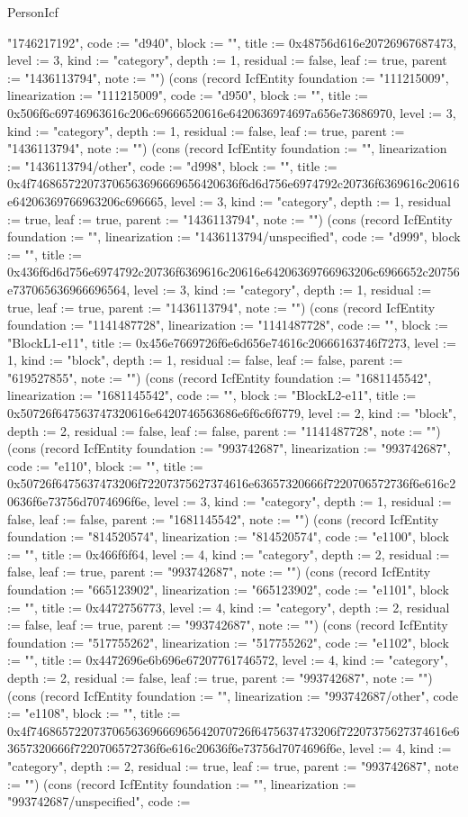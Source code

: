 \begin{lexlean}{PersonIcf}
\begin{semanticmodule}
{"1746217192", code := "d940", block := "", title := 0x48756d616e20726967687473, level := 3, kind := "category", depth := 1, residual := false, leaf := true, parent := "1436113794", note := ""}) (cons (record IcfEntity {foundation := "111215009", linearization := "111215009", code := "d950", block := "", title := 0x506f6c69746963616c206c69666520616e6420636974697a656e73686970, level := 3, kind := "category", depth := 1, residual := false, leaf := true, parent := "1436113794", note := ""}) (cons (record IcfEntity {foundation := "", linearization := "1436113794/other", code := "d998", block := "", title := 0x4f746865722073706563696669656420636f6d6d756e6974792c20736f6369616c20616e64206369766963206c696665, level := 3, kind := "category", depth := 1, residual := true, leaf := true, parent := "1436113794", note := ""}) (cons (record IcfEntity {foundation := "", linearization := "1436113794/unspecified", code := "d999", block := "", title := 0x436f6d6d756e6974792c20736f6369616c20616e64206369766963206c6966652c20756e737065636966696564, level := 3, kind := "category", depth := 1, residual := true, leaf := true, parent := "1436113794", note := ""}) (cons (record IcfEntity {foundation := "1141487728", linearization := "1141487728", code := "", block := "BlockL1-e11", title := 0x456e7669726f6e6d656e74616c20666163746f7273, level := 1, kind := "block", depth := 1, residual := false, leaf := false, parent := "619527855", note := ""}) (cons (record IcfEntity {foundation := "1681145542", linearization := "1681145542", code := "", block := "BlockL2-e11", title := 0x50726f647563747320616e6420746563686e6f6c6f6779, level := 2, kind := "block", depth := 2, residual := false, leaf := false, parent := "1141487728", note := ""}) (cons (record IcfEntity {foundation := "993742687", linearization := "993742687", code := "e110", block := "", title := 0x50726f6475637473206f72207375627374616e63657320666f7220706572736f6e616c20636f6e73756d7074696f6e, level := 3, kind := "category", depth := 1, residual := false, leaf := false, parent := "1681145542", note := ""}) (cons (record IcfEntity {foundation := "814520574", linearization := "814520574", code := "e1100", block := "", title := 0x466f6f64, level := 4, kind := "category", depth := 2, residual := false, leaf := true, parent := "993742687", note := ""}) (cons (record IcfEntity {foundation := "665123902", linearization := "665123902", code := "e1101", block := "", title := 0x4472756773, level := 4, kind := "category", depth := 2, residual := false, leaf := true, parent := "993742687", note := ""}) (cons (record IcfEntity {foundation := "517755262", linearization := "517755262", code := "e1102", block := "", title := 0x4472696e6b696e67207761746572, level := 4, kind := "category", depth := 2, residual := false, leaf := true, parent := "993742687", note := ""}) (cons (record IcfEntity {foundation := "", linearization := "993742687/other", code := "e1108", block := "", title := 0x4f74686572207370656369666965642070726f6475637473206f72207375627374616e63657320666f7220706572736f6e616c20636f6e73756d7074696f6e, level := 4, kind := "category", depth := 2, residual := true, leaf := true, parent := "993742687", note := ""}) (cons (record IcfEntity {foundation := "", linearization := "993742687/unspecified", code := }
\end{semanticmodule}
\end{lexlean}
